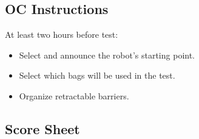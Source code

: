 \subsection*{OC Instructions}

At least two hours before test:
\begin{itemize}[nosep]
	\item Select and announce the robot's starting point.
	\item Select which bags will be used in the test.
	\item Organize retractable barriers.
\end{itemize}

\subsection*{Score Sheet}


